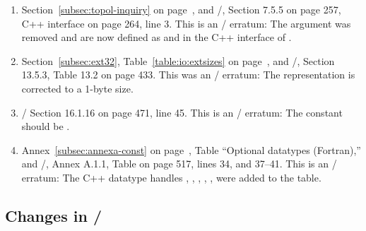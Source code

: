 \begin{enumerate}
\item 
Section~\ref{subsec:topol-inquiry} on page~\pageref{subsec:topol-inquiry}, and 
\MPIIIDOTII/, Section 7.5.5 on page 257, C++ interface on page 264, line 3. 
\newline 
This is an \MPIIIDOTII/ erratum: 
The argument  was removed and  are 
now defined as  and 
in the C++ interface of 
. 

\item 
Section~\ref{subsec:ext32}, Table~\ref{table:io:extsizes} on page~\pageref{table:io:extsizes}, and
\MPIIIDOTII/, Section 13.5.3, Table 13.2 on page 433.
\newline 
This was an \MPIIIDOTII/ erratum: 
The   representation is corrected to a 1-byte size.  

\item 
{\raggedright
\MPIIIDOTII/ Section 16.1.16 on page 471, line 45.
\newline 
This is an \MPIIIDOTII/ erratum: 
The constant  should be .

}
\item 
Annex~\ref{subsec:annexa-const} on page~\pageref{subsec:annexa-const}, Table ``Optional datatypes (Fortran),'' and
\newline 
\MPIIIDOTII/, Annex A.1.1, Table on page 517, lines 34, and 37--41. 
\newline 
This is an \MPIIIDOTII/ erratum: 
The C++ datatype handles , , 
, , , 
were added to the table. 
 
\end{enumerate}

\subsection{Changes in \texorpdfstring{\MPIIIIDOTO/}{MPI-3.0}}
 

